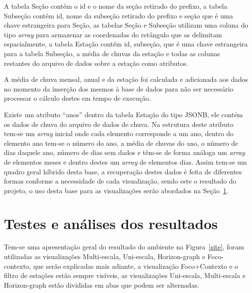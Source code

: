 \documentclass[article,11pt,oneside,a4paper]{abntex2} %
\begin{document}
	A tabela Seção contém o id e o nome da seção retirado do prefixo, a tabela Subseção contém id, nome da subseção retirado do prefixo e seção que é uma chave estrangeira para Seção, as tabelas Seção e Subseção utilizam uma coluna do tipo \textit{array} para armazenar as coordenadas do retângulo que as delimitam espacialmente, a tabela Estação contém id, subseção, que é uma chave estrangeira para a tabela Subseção, a média de chuvas da estação e todas as colunas restantes do arquivo de dados sobre a estação como atributos.

	A média de chuva mensal, anual e da estação foi calculada e adicionada aos dados no momento da inserção dos mesmos à base de dados para não ser necessário processar o cálculo destes em tempo de execução.

	Existe um atributo ``anos'' dentro da tabela Estação do tipo JSONB, ele contém os dados de chuva do arquivo de dados de chuva. Na estrutura deste atributo tem-se um \textit{array} inicial onde cada elemento corresponde a um ano, dentro do elemento ano tem-se o número do ano, a média de chuvas do ano, o número de dias daquele ano, número de dias sem dados e têm-se de forma análoga um \textit{array} de elementos meses e dentro destes um \textit{array} de elementos dias. Assim tem-se um quadro geral híbrido desta base, a recuperação destes dados é feita de diferentes formas conforme a necessidade de cada visualização, sendo este o resultado do projeto, o uso desta base para as visualizações serão abordados na Seção~\ref{testes}.

	\section{Testes e análises dos resultados}
		\label{testes}
		\hspace{13pt}
	Tem-se uma apresentação geral do resultado do ambiente na Figura~\ref{site}, foram utilizadas as visualizações Multi-escala, Uni-escala, Horizon-graph e Foco-contexto, que serão explicadas mais adiante, a visualização Foco+Contexto e o filtro de estações estão sempre visíveis, as visualizações Uni-escala, Multi-escala e Horizon-graph estão divididas em abas que podem ser alternadas.		
	
\end{document}
